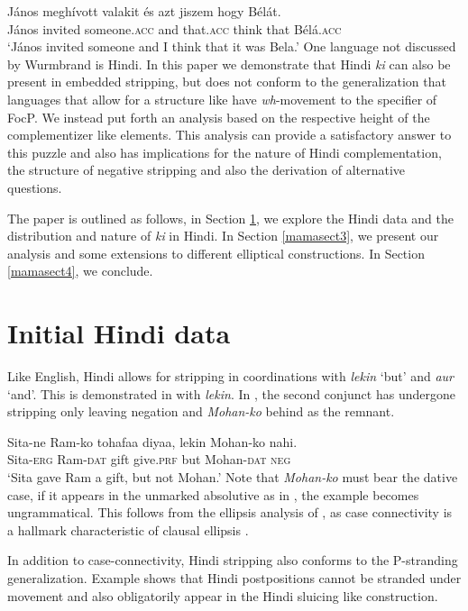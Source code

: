 \documentclass[output=paper]{langscibook}
\begin{document}
\ea \label{maex4}
    \gll J\'{a}nos megh\'{i}vott valakit \'{e}s azt jiszem hogy B\'{e}l\'{a}t.\\
    J\'{a}nos invited someone.\textsc{acc} and that.\textsc{acc} think that B\'{e}l\'{a}.\textsc{acc}\\
    \glt `J\'{a}nos invited someone and I think that it was Bela.'
\z
One language not discussed by Wurmbrand is Hindi. In this paper we demonstrate that Hindi \emph{ki} can also be present in embedded stripping, but does not conform to the generalization that languages that allow for a structure like  have \textit{wh}-movement to the specifier of FocP. We instead put forth an analysis based on the respective height of the complementizer like elements. This analysis can provide a satisfactory answer to this puzzle and also has implications for the nature of Hindi complementation, the structure of negative stripping and also the derivation of alternative questions.

The paper is outlined as follows, in Section \ref{mamasect2}, we explore the Hindi data and the distribution and nature of \emph{ki} in Hindi. In Section \ref{mamasect3}, we present our analysis and some extensions to different elliptical constructions. In Section \ref{mamasect4}, we conclude.

\section{Initial Hindi data}\label{mamasect2}
Like English, Hindi allows for stripping in coordinations with \emph{lekin} `but' and \emph{aur} `and'. This is demonstrated in  with \emph{lekin}. In , the second conjunct has undergone stripping only leaving negation and \emph{Mohan-ko} behind as the remnant.

\ea \label{maex5}
    \gll Sita-ne Ram-ko tohafaa diyaa, lekin Mohan-ko nahi.\\
    Sita-\textsc{erg} Ram-\textsc{dat} gift give.\textsc{prf} but Mohan-\textsc{dat} \textsc{neg}\\
    \glt `Sita gave Ram a gift, but not Mohan.'
\z 
Note that \emph{Mohan-ko} must bear the dative case, if it appears in the unmarked absolutive as in , the example becomes ungrammatical. This follows from the ellipsis analysis of , as case connectivity is a hallmark characteristic of clausal ellipsis \citep{merchant01}.

\z 
In addition to case-connectivity, Hindi stripping also conforms to the P-stranding generalization. Example  shows that Hindi postpositions cannot be stranded under movement and also obligatorily appear in the Hindi sluicing like construction.
\end{document}
